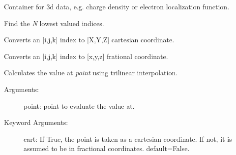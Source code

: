 \documentclass[letterpaper,10pt,english]{sphinxmanual}
\begin{document}

\begin{fulllineitems}
\label{models:qmpy.GridData}
Container for 3d data, e.g. charge density or electron localization
function.

\begin{fulllineitems}
\label{models:qmpy.GridData.find_min_coord}
Find the \emph{N} lowest valued indices.

\end{fulllineitems}


\begin{fulllineitems}
\label{models:qmpy.GridData.ind_to_cart}
Converts an {[}i,j,k{]} index to {[}X,Y,Z{]} cartesian coordinate.

\end{fulllineitems}


\begin{fulllineitems}
\label{models:qmpy.GridData.ind_to_coord}
Converts an {[}i,j,k{]} index to {[}x,y,z{]} frational coordinate.

\end{fulllineitems}


\begin{fulllineitems}
\label{models:qmpy.GridData.interpolate}
Calculates the value at \emph{point} using trilinear interpolation.
\begin{description}
\item[{Arguments:}] \leavevmode
point: point to evaluate the value at.

\item[{Keyword Arguments:}] \leavevmode
cart: If True, the point is taken as a cartesian coordinate. If
not, it is assumed to be in fractional coordinates. default=False.

\end{description}


\end{fulllineitems}
\end{fulllineitems}
\end{document}
